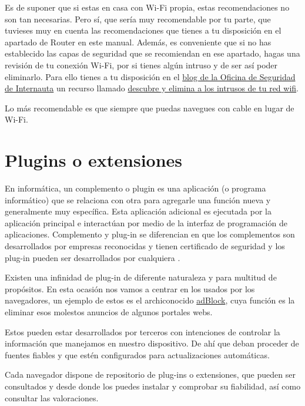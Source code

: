 \documentclass[
  a4paper,
  openany]{book}
\begin{document}
Es de suponer que si estas en casa con Wi-Fi propia, estas recomendaciones no son tan necesarias. Pero sí, que sería muy recomendable por tu parte, que tuvieses muy en cuenta las recomendaciones que tienes a tu disposición en el apartado de Router en este manual. Además, es conveniente que si no has establecido las capas de seguridad que se recomiendan en ese apartado, hagas una revisión de tu conexión Wi-Fi, por si tienes algún intruso y de ser así poder eliminarlo. Para ello tienes a tu disposición en el \href{https://www.osi.es/es/actualidad/blog}{blog de la Oficina de Seguridad de Internauta} un recurso llamado \href{https://www.osi.es/es/actualidad/blog/2019/09/25/descubre-y-elimina-los-intrusos-de-tu-red-wifi}{descubre y elimina a los intrusos de tu red wifi}.

Lo más recomendable es que siempre que puedas navegues con cable en lugar de Wi-Fi.

\hypertarget{plugins-o-extensiones}{%
\section{Plugins o extensiones}\label{plugins-o-extensiones}}

En informática, un complemento o plugin es una aplicación (o programa informático) que se relaciona con otra para agregarle una función nueva y generalmente muy específica. Esta aplicación adicional es ejecutada por la aplicación principal e interactúan por medio de la interfaz de programación de aplicaciones. Complemento y plug-in se diferencian en que los complementos son desarrollados por empresas reconocidas y tienen certificado de seguridad y los plug-in pueden ser desarrollados por cualquiera \citep{IONOS-plugin}.

Existen una infinidad de plug-in de diferente naturaleza y para multitud de propósitos. En esta ocasión nos vamos a centrar en los usados por los navegadores, un ejemplo de estos es el archiconocido \href{https://getadblock.com/}{adBlock}, cuya función es la eliminar esos molestos anuncios de algunos portales webs.

Estos pueden estar desarrollados por terceros con intenciones de controlar la información que manejamos en nuestro dispositivo. De ahí que deban proceder de fuentes fiables y que estén configurados para actualizaciones automáticas.

Cada navegador dispone de repositorio de plug-ins o extensiones, que pueden ser consultados y desde donde los puedes instalar y comprobar su fiabilidad, así como consultar las valoraciones.
\end{document}
